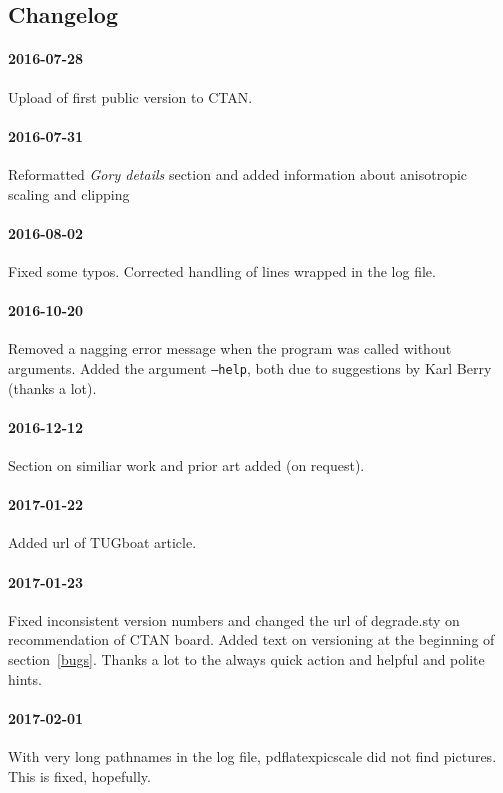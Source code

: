 \documentclass[10pt,a4paper]{article}
\begin{document}
\subsection{Changelog}

\paragraph{2016-07-28} Upload of first public version to CTAN.

\paragraph{2016-07-31} Reformatted \emph{Gory details} section and added
information about anisotropic scaling and clipping

\paragraph{2016-08-02} Fixed some typos. Corrected handling of lines wrapped
in the log file. 

\paragraph{2016-10-20} Removed a nagging error message when the program was
called without arguments. Added the argument \texttt{--help}, both due to
suggestions by Karl Berry (thanks a lot).

\paragraph{2016-12-12} Section on similiar work and prior art added (on request).

\paragraph{2017-01-22} Added url of TUGboat article.

\paragraph{2017-01-23} Fixed inconsistent version numbers and changed the url
of degrade.sty on recommendation of CTAN board. Added text on versioning at
the beginning of section~\ref{bugs}. Thanks a lot to the always quick action
and helpful and polite hints.

\paragraph{2017-02-01} With very long pathnames in the log file,
pdflatexpicscale did not find pictures. This is fixed, hopefully.
\end{document}
